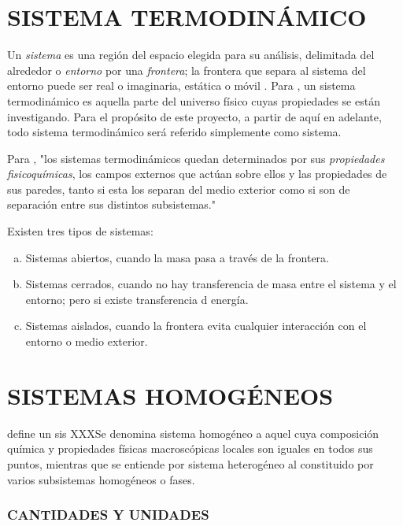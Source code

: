 \section{SISTEMA TERMODINÁMICO}
  Un \textit{sistema} es una región del espacio elegida para su análisis, delimitada del alrededor o \textit{entorno} por una \textit{frontera}; la frontera que separa al sistema del entorno puede ser real o imaginaria, estática o móvil \parencite{bib:cengel2015termodinamica}. Para \textcite{bib:castellan1998fisicoquimica}, un sistema termodinámico es aquella parte del universo físico cuyas propiedades se están investigando. Para el propósito de este proyecto, a partir de aquí en adelante, todo sistema termodinámico será referido simplemente como sistema. 

  Para \parencite[p.28]{bib:rodriguez2010termodinamica}, "los sistemas termodinámicos quedan determinados por sus \textit{propiedades fisicoquímicas}, los campos externos que actúan sobre ellos y las propiedades de sus paredes, tanto si esta los separan del medio exterior como si son de separación entre sus distintos subsistemas."

  Existen tres tipos de sistemas:

  \begin{enumerate}[a)]
    \item Sistemas abiertos, cuando la masa pasa a través de la frontera.
    \item Sistemas cerrados, cuando no hay transferencia de masa entre el sistema y el entorno; pero si existe transferencia d energía.
    \item Sistemas aislados, cuando la frontera evita cualquier interacción con el entorno o medio exterior.
  \end{enumerate}


\section{SISTEMAS HOMOGÉNEOS}
  \Parencite{bib:rodriguez2010termodinamica} define un sis XXXSe denomina sistema homogéneo a aquel cuya composición química y propiedades físicas macroscópicas locales son iguales en todos sus puntos, mientras que se entiende por sistema heterogéneo al constituido por varios subsistemas homogéneos o fases.

\subsubsection{CANTIDADES Y UNIDADES}


